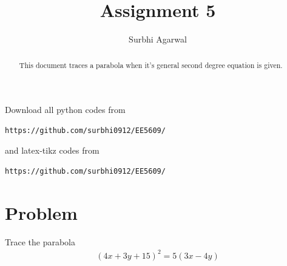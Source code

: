 \documentclass[journal,12pt,twocolumn]{IEEEtran}
\begin{document}
\let\StandardTheFigure\thefigure
\let\vec\mathbf

\renewcommand{\thefigure}{\theproblem}

\def\putbox#1#2#3{\makebox[0in][l]{\makebox[#1][l]{}\raisebox{\baselineskip}[0in][0in]{\raisebox{#2}[0in][0in]{#3}}}}
     \def\rightbox#1{\makebox[0in][r]{#1}}
     \def\centbox#1{\makebox[0in]{#1}}
     \def\topbox#1{\raisebox{-\baselineskip}[0in][0in]{#1}}
     \def\midbox#1{\raisebox{-0.5\baselineskip}[0in][0in]{#1}}
\vspace{3cm}

\title{Assignment 5}
\author{Surbhi Agarwal}

\maketitle

\newpage


\bigskip

\renewcommand{\thefigure}{\theenumi}
\renewcommand{\thetable}{\theenumi}

\begin{abstract}
This document traces a parabola when it's general second degree equation is given. 
\end{abstract}

Download all python codes from 
%
\begin{lstlisting}
https://github.com/surbhi0912/EE5609/
\end{lstlisting}
%
and latex-tikz codes from 
%
\begin{lstlisting}
https://github.com/surbhi0912/EE5609/
\end{lstlisting}
%
\section{Problem}
Trace the parabola
\begin{align}\nonumber
    (4x+3y+15)^2=5(3x-4y)
\end{align}
\end{document}
